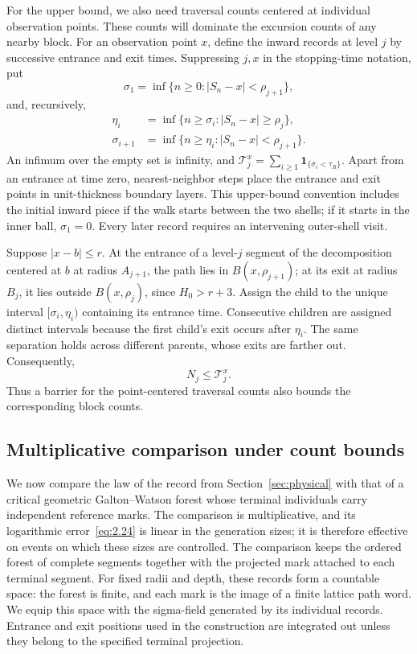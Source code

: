 \documentclass[11pt,letterpaper,reqno]{amsart}
\newif\ifrevmarks \revmarkstrue
\newif\ifshowdeleted \showdeletedfalse
\newcommand{\add}[1]{\ifrevmarks\textcolor{revorange}{#1}\else#1\fi}
\newcommand{\del}[1]{\ifrevmarks\ifshowdeleted{\color{revorange}\footnotesize[\textit{deleted:}~#1]}%
  \else\mbox{\textsuperscript{\textcolor{revorange}{\normalfont\bfseries[del]}}}\fi\fi}
\numberwithin{equation}{section}
\theoremstyle{remark}
\begin{document}
For the upper bound, we also need traversal counts centered at individual observation points. These counts will dominate the excursion counts of any nearby block. For an observation point $x$, define the inward records at level $j$ by successive entrance and exit times. Suppressing $j,x$ in the stopping-time notation, put
\[
\sigma_1=\inf\{n\ge0:|S_n-x|<\rho_{j+1}\},
\]
and, recursively,
\begin{equation}\label{eq:traversal-stopping}
\begin{aligned}
\eta_i&=\inf\{n\ge\sigma_i:|S_n-x|\ge\rho_j\},\\
\sigma_{i+1}&=\inf\{n\ge\eta_i:|S_n-x|<\rho_{j+1}\}.
\end{aligned}
\end{equation}
An infimum over the empty set is infinity, and
$\mathcal T_j^x=\sum_{i\ge1}\mathbf1_{\{\sigma_i<\tau_R\}}$.
Apart from an entrance at time zero, nearest-neighbor steps place the entrance and exit points in unit-thickness boundary layers. This upper-bound convention includes the initial inward piece if the walk starts between the two shells; if it starts in the inner ball, $\sigma_1=0$. Every later record requires an intervening outer-shell visit.

Suppose $|x-b|\le r$. At the entrance of a \del{block child}\add{level-$j$ segment of the decomposition centered at $b$} at radius $A_{j+1}$, the path lies in $B(x,\rho_{j+1})$; at its exit at radius $B_j$, it lies outside $B(x,\rho_j)$, since $H_0>r+3$. Assign the child to the unique interval $[\sigma_i,\eta_i)$ containing its entrance time. Consecutive children are assigned distinct intervals because the first child's exit occurs after $\eta_i$. The same separation holds across different parents, whose exits are farther out. Consequently,
\begin{equation}\label{eq:2.22}
N_j\le\mathcal T_j^x.
\end{equation}
Thus a barrier for the point-centered traversal counts also bounds the corresponding block counts.

\subsection{Multiplicative comparison under count bounds}\label{sec:recordcomparison}
\add{We now compare the law of the record from Section~\ref{sec:physical} with that of a critical geometric Galton--Watson forest whose terminal individuals carry independent reference marks. The comparison is multiplicative, and its logarithmic error~\eqref{eq:2.24} is linear in the generation sizes; it is therefore effective on events on which these sizes are controlled.} The comparison keeps the ordered forest of complete segments together with the projected mark attached to each terminal segment. For fixed radii and depth, these records form a countable space: the forest is finite, and each mark is the image of a finite lattice path word. We equip this space with the sigma-field generated by its individual records. Entrance and exit positions used in the construction are integrated out unless they belong to the specified terminal projection.
\end{document}
